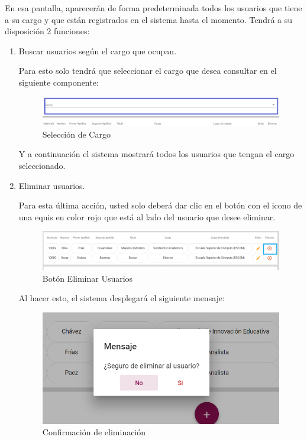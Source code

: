   En esa pantalla, aparecerán de forma predeterminada todos los usuarios que tiene a su cargo y que están registrados en el sistema hasta el momento. Tendrá a su disposición 2 funciones:
  \newpage
  \begin{enumerate}
  	
  	\item   Buscar usuarios según el cargo que ocupan.
  	
  	Para esto solo tendrá que seleccionar el cargo que desea consultar en el siguiente componente:
  	
  	\begin{figure}[!hbtp]
  		\centering
  		\hypertarget{cargo1}{\includegraphics[width=0.7\linewidth]{images/SP5/BtnCargo1}}
  		\caption{Selección de Cargo}
  		\label{cargo1}
  	\end{figure}
  	
  	Y a continuación el sistema mostrará todos los usuarios que tengan el cargo seleccionado.
  	
  	   \newpage
  	
  	\item Eliminar usuarios.
  	
  	Para esta última acción, usted solo deberá dar clic en el botón con el icono de una equis en color rojo que está al lado del usuario que desee  eliminar.
  	
  	\begin{figure}[!hbtp]
  		\centering
  		\hypertarget{eliminar}{\includegraphics[width=0.7\linewidth]{images/SP5/BtnEliminar}}
  		\caption{Botón Eliminar Usuarios}
  		\label{eliminar}
  	\end{figure}
  	
  	Al hacer esto, el sistema desplegará el siguiente mensaje:
  	
  	\begin{figure}[!hbtp]
  		\centering
  		\includegraphics[width=0.4\linewidth]{images/SP5/MSG22}
  		\caption{Confirmación de eliminación}
  		\label{confirmarE}
  		

\end{figure}
\end{enumerate}
